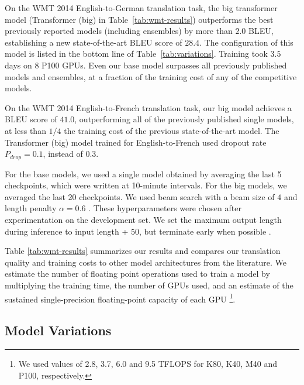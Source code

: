 \documentclass{article}
\begin{document}
On the WMT 2014 English-to-German translation task, the big transformer model (Transformer (big) in Table~\ref{tab:wmt-results}) outperforms the best previously reported models (including ensembles) by more than $2.0$ BLEU, establishing a new state-of-the-art BLEU score of $28.4$.  The configuration of this model is listed in the bottom line of Table~\ref{tab:variations}.  Training took $3.5$ days on $8$ P100 GPUs.  Even our base model surpasses all previously published models and ensembles, at a fraction of the training cost of any of the competitive models.

On the WMT 2014 English-to-French translation task, our big model achieves a BLEU score of $41.0$, outperforming all of the previously published single models, at less than $1/4$ the training cost of the previous state-of-the-art model. The Transformer (big) model trained for English-to-French used dropout rate $P_{drop}=0.1$, instead of $0.3$.

For the base models, we used a single model obtained by averaging the last 5 checkpoints, which were written at 10-minute intervals.  For the big models, we averaged the last 20 checkpoints. We used beam search with a beam size of $4$ and length penalty $\alpha=0.6$ \citep{wu2016google}.  These hyperparameters were chosen after experimentation on the development set.  We set the maximum output length during inference to input length + $50$, but terminate early when possible \citep{wu2016google}.

Table \ref{tab:wmt-results} summarizes our results and compares our translation quality and training costs to other model architectures from the literature.  We estimate the number of floating point operations used to train a model by multiplying the training time, the number of GPUs used, and an estimate of the sustained single-precision floating-point capacity of each GPU \footnote{We used values of 2.8, 3.7, 6.0 and 9.5 TFLOPS for K80, K40, M40 and P100, respectively.}.


\subsection{Model Variations}
\end{document}
